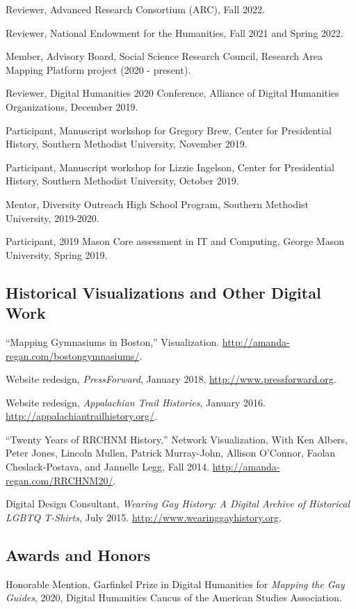 \documentclass[11pt]{article}
\begin{document}
Reviewer, Advanced Research Consortium (ARC), Fall 2022. 

Reviewer, National Endowment for the Humanities, Fall 2021 and Spring 2022.

Member, Advisory Board, Social Science Research Council, Research Area Mapping Platform project (2020 - present).

Reviewer, Digital Humanities 2020 Conference, Alliance of Digital Humanities Organizations, December 2019.

Participant, Manuscript workshop for Gregory Brew, Center for Presidential History, Southern Methodist University, November 2019.

Participant, Manuscript workshop for Lizzie Ingelson, Center for Presidential History, Southern Methodist University, October 2019.

Mentor, Diversity Outreach High School Program, Southern Methodist University, 2019-2020.

Participant, 2019 Mason Core assessment in IT and Computing, George Mason University, Spring 2019.

\subsection{Historical Visualizations and Other Digital Work}\label{other-digital-work}
``Mapping Gymnasiums in Boston,'' Visualization. \url{http://amanda-regan.com/bostongymnasiums/}.

Website redesign, \emph{PressForward}, January 2018, \url{http://www.pressforward.org}.

Website redesign, \emph{Appalachian Trail Histories}, January 2016. \url{http://appalachiantrailhistory.org/}.

``Twenty Years of RRCHNM History,'' Network Visualization, With Ken Albers, Peter Jones, Lincoln Mullen, Patrick Murray-John, Allison O’Connor, Faolan Cheslack-Postava, and Jannelle Legg, Fall 2014. \url{http://amanda-regan.com/RRCHNM20/}.

Digital Design Consultant, \emph{Wearing Gay History: A Digital Archive of Historical LGBTQ T-Shirts}, July 2015. \url{http://www.wearinggayhistory.org}.

\subsection{Awards and Honors}
Honorable Mention, Garfinkel Prize in Digital Humanities for \emph{Mapping the Gay Guides}, 2020, Digital Humanities Caucus of the American Studies Association.
\end{document}

